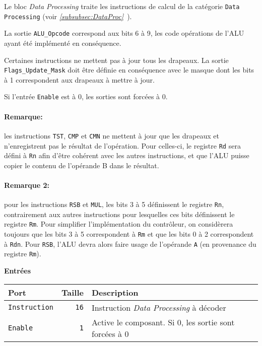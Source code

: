 \documentclass{article}
\begin{document}
    Le bloc \textit{Data Processing} traite les instructions de calcul de la catégorie \texttt{Data Processing} (voir \textit{\ref{subsubsec:DataProc}~}).

    La sortie \texttt{ALU\_Opcode} correspond aux bits 6 à 9, les code opérations de l'ALU ayant été implémenté en conséquence.

    Certaines instructions ne mettent pas à jour tous les drapeaux.
    La sortie \texttt{Flags\_Update\_Mask} doit être définie en conséquence avec le masque dont les bits à 1 correspondent aux drapeaux à mettre à jour.

    Si l'entrée \texttt{Enable} est à 0, les sorties sont forcées à 0.

    \paragraph{Remarque:} les instructions \texttt{TST}, \texttt{CMP} et \texttt{CMN} ne mettent à jour que les drapeaux et n'enregistrent pas le résultat de l'opération.
    Pour celles-ci, le registre \texttt{Rd} sera défini à \texttt{Rn} afin d'être cohérent avec les autres instructions, et que l'ALU puisse copier le contenu de l'opérande B dans le résultat.

    \paragraph{Remarque 2:} pour les instructions \texttt{RSB} et \texttt{MUL}, les bits 3 à 5 définissent le registre \texttt{Rn}, contrairement aux autres instructions pour lesquelles ces bits définissent le registre \texttt{Rm}.
    Pour simplifier l'implémentation du contrôleur, on considèrera toujours que les bits 3 à 5 correspondent à \texttt{Rm} et que les bits 0 à 2 correspondent à \texttt{Rdn}.
    Pour \texttt{RSB}, l'ALU devra alors faire usage de l'opérande \texttt{A} (en provenance du registre \texttt{Rm}).



    \textbf{Entrées}\\

    \begin{tabular}{|l|r|l|}
        \hline
        \textbf{Port}       & \textbf{Taille} & \textbf{Description}                                   \\
        \hline

        \texttt{Instruction} & \texttt{16}     & Instruction \textit{Data Processing} à décoder         \\
        \hline
        \texttt{Enable}     & \texttt{1}      & Active le composant.
        Si 0, les sortie sont forcées à 0 \\


        \hline
    \end{tabular}
\end{document}
